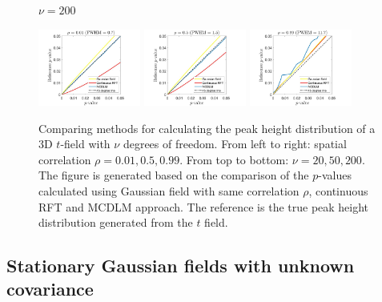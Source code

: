 \documentclass{article}
\begin{document}
\begin{figure}[!htp]
\begin{sideways}
\phantom{------------------}$\nu = 200$
\end{sideways}
\includegraphics[trim=70 5 100 5, clip,width=0.3\textwidth]{figure/3D_nu200_rho0.01.jpg}
\includegraphics[trim=70 5 100 5, clip,width=0.3\textwidth]{figure/3D_nu200_rho0.5.jpg}
\includegraphics[trim=70 5 100 5, clip,width=0.3\textwidth]{figure/3D_nu200_rho0.99.jpg}
\caption{Comparing methods for calculating the peak height distribution of a 3D $t$-field with $\nu$ degrees of freedom. From left to right: spatial correlation $\rho = 0.01, 0.5, 0.99$. From top to bottom: $\nu = 20, 50, 200$. The figure is generated based on the comparison of the $p$-values calculated using Gaussian field with same correlation $\rho$, continuous RFT and MCDLM approach. The reference is the true peak height distribution generated from the $t$ field. \label{fig12}}
\end{figure}

\clearpage
\subsection{Stationary Gaussian fields with unknown covariance}
\label{sec4.4}
\end{document}
